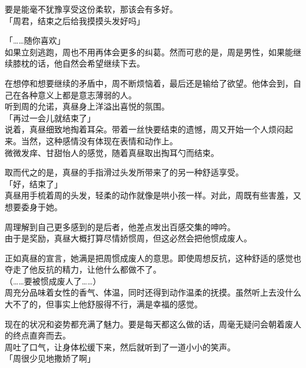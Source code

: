 要是能毫不犹豫享受这份柔软，那该会有多好。\\

「周君，结束之后给我摸摸头发好吗」

「……随你喜欢」\\

如果立刻逃跑，周也不用再体会更多的纠葛。然而可悲的是，周是男性，如果能继续膝枕的话，他自然会希望继续下去。

在想停和想要继续的矛盾中，周不断烦恼着，最后还是输给了欲望。他体会到，自己在各种意义上都是意志薄弱的人。\\

听到周的允诺，真昼身上洋溢出喜悦的氛围。\\

「再过一会儿就结束了」\\

说着，真昼细致地掏着耳朵。带着一丝快要结束的遗憾，周又开始一个人烦闷起来。当然，这种感情没有体现在表情和动作上。\\

微微发痒、甘甜怡人的感觉，随着真昼取出掏耳勺而结束。

取而代之的是，真昼的手指滑过头发所带来了的另一种舒适享受。\\

「好，结束了」\\

真昼用手梳着周的头发，轻柔的动作就像是哄小孩一样。对此，周既有些害羞，又想要委身于她。

周理解到自己更多感到的是后者，他差点发出百感交集的呻吟。\\

由于是奖励，真昼大概打算尽情娇惯周，但这必然会把他惯成废人。

正如真昼的宣言，她满是把周惯成废人的意思。即使周想反抗，这种舒适的感觉也夺走了他反抗的精力，让他什么都做不了。\\

（……要被惯成废人了……）\\

周充分品味着女性的香气、体温，同时还得到动作温柔的抚摸。虽然听上去没什么大不了的，但事实上他舒服得不行，满是幸福的感觉。

现在的状况和姿势都充满了魅力。要是每天都这么做的话，周毫无疑问会朝着废人的终点直奔而去。\\

周吐了口气，让身体松缓下来，然后就听到了一道小小的笑声。\\

「周很少见地撒娇了啊」

